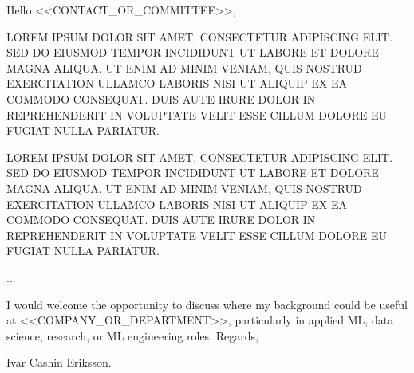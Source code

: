 \documentclass[11pt,a4paper]{moderncv}
\begin{document}
\makecvtitle
Hello <<CONTACT_OR_COMMITTEE>>, 

\vspace*{2em}
LOREM IPSUM DOLOR SIT AMET, CONSECTETUR ADIPISCING ELIT. SED DO EIUSMOD TEMPOR INCIDIDUNT UT LABORE ET DOLORE MAGNA ALIQUA. UT ENIM AD MINIM VENIAM, QUIS NOSTRUD EXERCITATION ULLAMCO LABORIS NISI UT ALIQUIP EX EA COMMODO CONSEQUAT. DUIS AUTE IRURE DOLOR IN REPREHENDERIT IN VOLUPTATE VELIT ESSE CILLUM DOLORE EU FUGIAT NULLA PARIATUR.

\hspace*{2em}
LOREM IPSUM DOLOR SIT AMET, CONSECTETUR ADIPISCING ELIT. SED DO EIUSMOD TEMPOR INCIDIDUNT UT LABORE ET DOLORE MAGNA ALIQUA. UT ENIM AD MINIM VENIAM, QUIS NOSTRUD EXERCITATION ULLAMCO LABORIS NISI UT ALIQUIP EX EA COMMODO CONSEQUAT. DUIS AUTE IRURE DOLOR IN REPREHENDERIT IN VOLUPTATE VELIT ESSE CILLUM DOLORE EU FUGIAT NULLA PARIATUR.

...

\vspace*{2em}
I would welcome the opportunity to discuss where my background could be useful at <<COMPANY_OR_DEPARTMENT>>, particularly in applied ML, data science, research, or ML engineering roles. Regards,

\vspace*{1em}
Ivar Cashin Eriksson.
\end{document}
